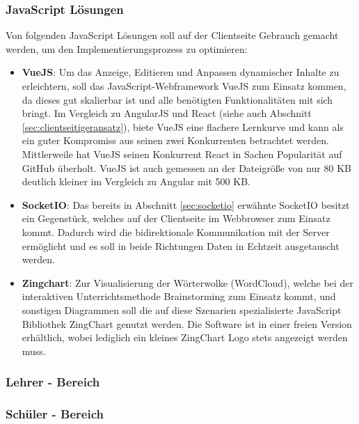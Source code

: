 \subsubsection{JavaScript Lösungen}\label{sec:clientjs}
Von folgenden JavaScript Lösungen soll auf der Clientseite Gebrauch gemacht werden, um den Implementierungsprozess zu optimieren:
\begin{itemize}
	\item \textbf{VueJS}: Um das Anzeige, Editieren und Anpassen dynamischer Inhalte zu erleichtern, soll das JavaScript-Webframework VueJS zum Einsatz kommen, da dieses gut skalierbar ist und alle benötigten Funktionalitäten mit sich bringt. Im Vergleich zu AngularJS und React (siehe auch Abschnitt \ref{sec:clientseitigeransatz}), biete VueJS eine flachere Lernkurve und kann als ein guter Kompromiss aus seinen zwei Konkurrenten betrachtet werden. Mittlerweile hat VueJS seinen Konkurrent React in Sachen Popularität auf GitHub überholt\cite{Daityari2019}. VueJS ist auch gemessen an der Dateigröße von nur 80 KB deutlich kleiner im Vergleich zu Angular mit 500 KB.
	\item \textbf{SocketIO}: Das bereits in Abschnitt \ref{sec:socketio} erwähnte SocketIO besitzt ein Gegenstück, welches auf der Clientseite im Webbrowser zum Einsatz kommt. Dadurch wird die bidirektionale Kommunikation mit der Server ermöglicht und es soll in beide Richtungen Daten in Echtzeit ausgetauscht werden. 
	\item \textbf{Zingchart}: Zur Visualisierung der Wörterwolke (WordCloud), welche bei der interaktiven Unterrichtsmethode Brainstorming zum Einsatz kommt, und sonstigen Diagrammen soll die auf diese Szenarien spezialisierte JavaScript Bibliothek ZingChart genutzt werden. Die Software ist in einer freien Version erhältlich, wobei lediglich ein kleines ZingChart Logo stets angezeigt werden muss\cite{zingchartpricing}.
\end{itemize}

\subsubsection{Lehrer - Bereich}\label{sec:lehrerbereich}
\subsubsection{Schüler - Bereich}\label{sec:schuelerbereich}